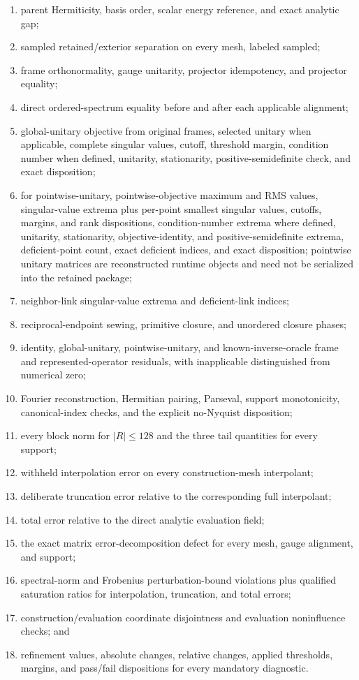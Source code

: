 \documentclass[11pt]{article}
\begin{document}
\begin{enumerate}
\item parent Hermiticity, basis order, scalar energy reference, and exact analytic gap;
\item sampled retained/exterior separation on every mesh, labeled sampled;
\item frame orthonormality, gauge unitarity, projector idempotency, and projector equality;
\item direct ordered-spectrum equality before and after each applicable alignment;
\item global-unitary objective from original frames, selected unitary when applicable, complete
singular values, cutoff, threshold margin, condition number when defined, unitarity,
stationarity, positive-semidefinite check, and exact disposition;
\item for pointwise-unitary, pointwise-objective maximum and RMS values, singular-value extrema plus
per-point smallest singular values, cutoffs, margins, and rank dispositions,
condition-number extrema where defined, unitarity, stationarity, objective-identity, and
positive-semidefinite extrema, deficient-point count, exact deficient indices, and exact
disposition; pointwise unitary matrices are reconstructed runtime objects and need not be
serialized into the retained package;
\item neighbor-link singular-value extrema and deficient-link indices;
\item reciprocal-endpoint sewing, primitive closure, and unordered closure phases;
\item identity, global-unitary, pointwise-unitary, and known-inverse-oracle frame and represented-operator residuals, with inapplicable distinguished from
numerical zero;
\item Fourier reconstruction, Hermitian pairing, Parseval, support monotonicity,
canonical-index checks, and the explicit no-Nyquist disposition;
\item every block norm for $|R|\leq128$ and the three tail quantities for every support;
\item withheld interpolation error on every construction-mesh interpolant;
\item deliberate truncation error relative to the corresponding full interpolant;
\item total error relative to the direct analytic evaluation field;
\item the exact matrix error-decomposition defect for every mesh, gauge alignment, and support;
\item spectral-norm and Frobenius perturbation-bound violations plus qualified saturation
ratios for interpolation, truncation, and total errors;
\item construction/evaluation coordinate disjointness and evaluation noninfluence checks;
and
\item refinement values, absolute changes, relative changes, applied thresholds, margins,
and pass/fail dispositions for every mandatory diagnostic.
\end{enumerate}
\end{document}
